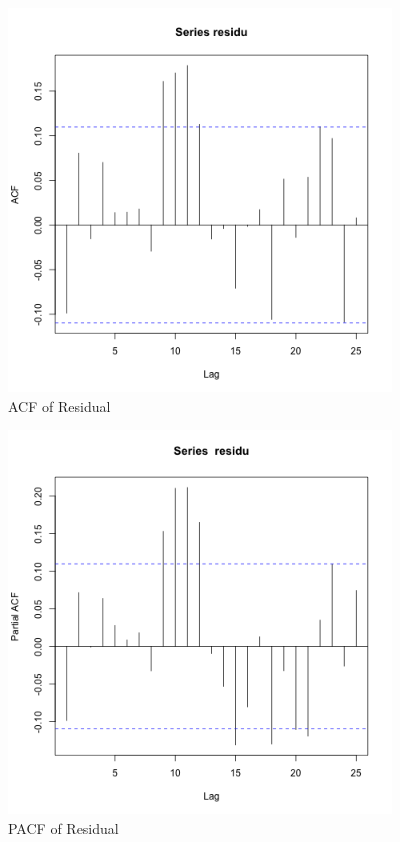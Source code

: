 \documentclass[11pt, oneside]{article}   	%
\begin{document}
 \begin{figure}[H] %
    \centering
    \includegraphics[width=4in]{acfresidual.png} 
    \caption{ACF of Residual}
    \label{fig:acfres}
 \end{figure}
 
 \begin{figure}[H] %
    \centering
    \includegraphics[width=4in]{pacfresidual.png} 
    \caption{PACF of Residual}
    \label{fig:pacfres}
 \end{figure}
 
\end{document}
